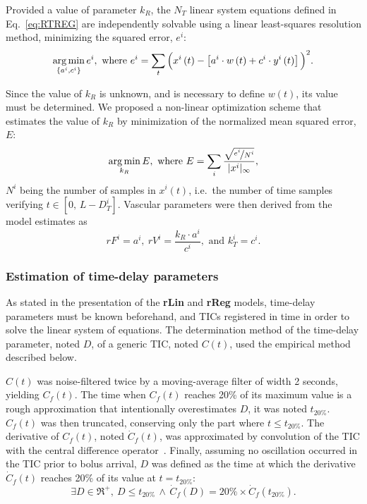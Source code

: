 Provided a value of parameter $k_R$, the $N_T$ linear system equations defined in Eq.~\ref{eq:RTREG} are independently solvable using a linear least-squares resolution method, minimizing the squared error, $e^i$:
\begin{equation}
\operatorname*{arg\,min}_{\left\lbrace a^i, c^i \right\rbrace} e^i, \textrm{ where } e^i = \sum_{t} \Big( x^i\left(t\right) - \left[a^i\cdot w\left(t\right) + c^i\cdot y^i\left(t\right) \right] \Big)^2.
\end{equation}

Since the value of $k_R$ is unknown, and is necessary to define $w\left(t\right)$, its value must be determined.
We proposed a non-linear optimization scheme that estimates the value of $k_R$ by minimization of the normalized mean squared error, $E$:
\begin{equation}
\operatorname*{arg\,min}_{k_R} E, \textrm{ where } E = \sum_i\frac{\sqrt{\nicefrac{e^i}{N^i} }}{\lvert x^i \rvert_{\infty}},
\end{equation}
$N^i$ being the number of samples in $x^i(t)$, i.e.~the number of time samples verifying $t \in \left[0,\,L-D_T^i\right]$.
Vascular parameters were then derived from the model estimates as 
\begin{equation}
rF^i = a^i,~rV^i = \frac{k_R \cdot a^i}{c^i}, \textrm{ and } k_T^i = c^i.
\end{equation}

\subsubsection{Estimation of time-delay parameters}
As stated in the presentation of the \textbf{rLin} and \textbf{rReg} models, time-delay parameters must be known beforehand, and TICs registered in time in order to solve the linear system of equations.
The determination method of the time-delay parameter, noted $D$, of a generic TIC, noted $C\left(t\right)$, used the empirical method described below.

$C\left(t\right)$ was noise-filtered twice by a moving-average filter of width 2 seconds, yielding $C_f\left(t\right)$.
The time when $C_f\left(t\right)$ reaches 20\% of its maximum value is a rough approximation that intentionally overestimates $D$, it was noted $t_{20\%}$.
$C_f\left(t\right)$ was then truncated, conserving only the part where $t \leq t_{20\%}$.
The derivative of $C_{f}\left(t\right)$, noted $\dot{C}_{f}\left(t\right)$, was approximated by convolution of the TIC with the central difference operator~\cite{Whittaker1967}. %
Finally, assuming no oscillation occurred in the TIC prior to bolus arrival, $D$ was defined as the time at which the derivative $\dot{C}_{f}\left(t\right)$ reaches 20\% of its value at $t = t_{20\%}$:
\begin{equation}
\exists D\in\Re^+,~D \leq t_{20\%}\,\wedge\,\dot{C}_{f}\left(D\right) = 20\% \times \dot{C}_{f}\left(t_{20\%}\right).
\end{equation}

